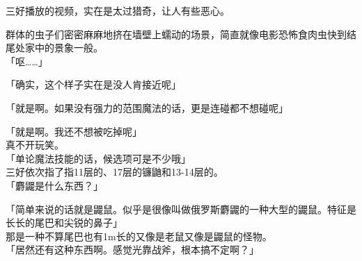 三好播放的视频，实在是太过猎奇，让人有些恶心。

群体的虫子们密密麻麻地挤在墙壁上蠕动的场景，简直就像电影恐怖食肉虫快到结尾处家中的景象一般。\\

「呕……」

「确实，这个样子实在是没人肯接近呢」

「就是啊。如果没有强力的范围魔法的话，更是连碰都不想碰呢」

「就是啊。我还不想被吃掉呢」\\

真不开玩笑。\\

「单论魔法技能的话，候选项可是不少哦」\\

三好依次指了指11层的、17层的镰鼬和13-14层的。\\

「麝鼹是什么东西？」

「简单来说的话就是鼹鼠。似乎是很像叫做俄罗斯麝鼹的一种大型的鼹鼠。特征是长长的尾巴和尖锐的鼻子」\\

那是一种不算尾巴也有1m长的又像是老鼠又像是鼹鼠的怪物。\\

「居然还有这种东西啊。感觉光靠战斧，根本搞不定啊？」

